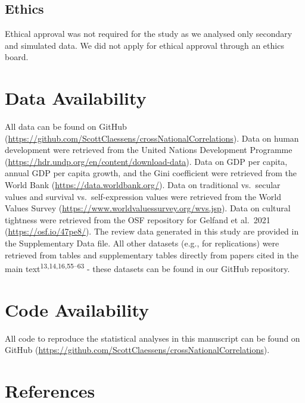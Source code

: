 \documentclass[
  man,floatsintext]{apa6}
\begin{document}
\hypertarget{ethics}{%
\subsection{Ethics}\label{ethics}}

Ethical approval was not required for the study as we analysed only secondary and simulated data. We did not apply for ethical approval through an ethics board.

\newpage
\nolinenumbers

\hypertarget{data-availability}{%
\section{Data Availability}\label{data-availability}}

All data can be found on GitHub (\url{https://github.com/ScottClaessens/crossNationalCorrelations}). Data on human development were retrieved from the United Nations Development Programme (\url{https://hdr.undp.org/en/content/download-data}). Data on GDP per capita, annual GDP per capita growth, and the Gini coefficient were retrieved from the World Bank (\url{https://data.worldbank.org/}). Data on traditional vs.~secular values and survival vs.~self-expression values were retrieved from the World Values Survey (\url{https://www.worldvaluessurvey.org/wvs.jsp}). Data on cultural tightness were retrieved from the OSF repository for Gelfand et al.~2021 (\url{https://osf.io/47pe8/}). The review data generated in this study are provided in the Supplementary Data file. All other datasets (e.g., for replications) were retrieved from tables and supplementary tables directly from papers cited in the main text\textsuperscript{13,14,16,55--63} - these datasets can be found in our GitHub repository.

\hypertarget{code-availability}{%
\section{Code Availability}\label{code-availability}}

All code to reproduce the statistical analyses in this manuscript can be found on GitHub (\url{https://github.com/ScottClaessens/crossNationalCorrelations}).

\newpage

\hypertarget{references}{%
\section{References}\label{references}}
\end{document}
